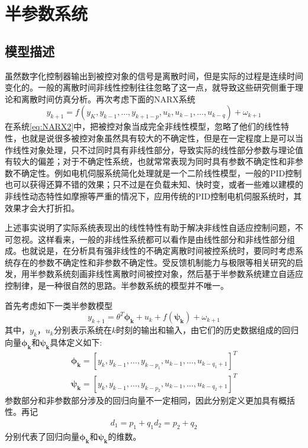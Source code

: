 \section{半参数系统}
\label{sect:2.2}
\subsection{模型描述}
\label{subsec:2.2.1}
虽然数字化控制器输出到被控对象的信号是离散时间，但是实际的过程是连续时间变化的。一般的离散时间非线性控制往往忽略了这一点，就导致这些研究侧重于理论和离散时间仿真分析。再次考虑下面的NARX系统
\begin{equation}%
\label{eq:NARX2}
y_{k+1} = f(y_{K},y_{k-1},\ldots,y_{k+1-p},u_{k},u_{k-1},\ldots,u_{k-q})+\omega_{k+1}
\end{equation}
在系统\eqref{eq:NARX2}中，把被控对象当成完全非线性模型，忽略了他们的线性特性，也就是说很多被控对象虽然具有较大的不确定性，但是在一定程度上是可以当作线性对象处理，只不过同时具有非线性部分，导致实际的线性部分参数与理论值有较大的偏差；对于不确定性系统，也就常常表现为同时具有参数不确定性和非参数不确定性。例如电机伺服系统简化处理就是一个二阶线性模型，一般的PID控制也可以获得还算不错的效果；只不过是在负载未知、快时变，或者一些难以建模的非线性动态特性如摩擦等严重的情况下，应用传统的PID控制电机伺服系统时，其效果才会大打折扣。

上述事实说明了实际系统表现出的线性特性有助于解决非线性自适应控制问题，不可忽视。这样看来，一般的非线性系统都可以看作是由线性部分和非线性部分组成。也就说是，在分析具有强非线性的不确定离散时间被控系统时，要同时考虑系统存在的参数不确定性和非参数不确定性。受反馈机制能力与极限等相关研究的启发，用半参数系统刻画非线性离散时间被控对象，然后基于半参数系统建立自适应控制律，是一种很自然的思路。半参数系统的模型并不唯一。

首先考虑如下一类半参数模型
\begin{equation}%
\label{eq:semi-u}
y_{k+1} = \theta^{T}\bm{\phi_{k}}+u_{k}+f(\bm{\psi_{k}})+\omega_{k+1}
\end{equation}
其中，$y_{k}$，$u_{k}$分别表示系统在$k$时刻的输出和输入，由它们的历史数据组成的回归向量$\bm{\phi_{k}}$和$\bm{\psi_{k}}$具体定义如下:
\begin{eqnarray}
\bm{\phi_{k}}=[y_{k},y_{k-1},\ldots,y_{k-p_{1}},u_{k-1},\dots,u_{k-q_{1}+1}]^{T}\\
\bm{\psi_{k}}=[y_{k},y_{k-1},\ldots,y_{k-p_{2}},u_{k-1},\dots,u_{k-q_{2}+1}]^{T}
\end{eqnarray}
参数部分和非参数部分涉及的回归向量不一定相同，因此分别定义更加具有概括性。再记
\begin{eqnarray}
d_{1}=p_{1}+q_{1}
d_{2}=p_{2}+q_{2}
\end{eqnarray}
分别代表了回归向量$\bm{\phi_{k}}$和$\bm{\psi_{k}}$的维数。

